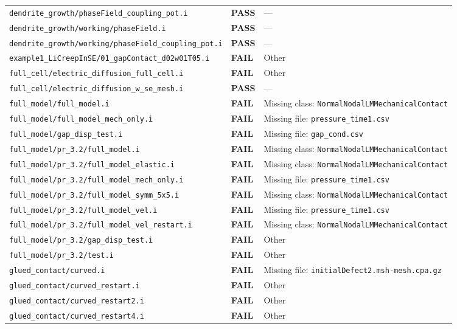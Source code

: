 \documentclass[10pt,letterpaper]{article}
\newcommand{\PASS}{\textcolor{passgreen}{\textbf{PASS}}}
\newcommand{\FAIL}{\textcolor{failred}{\textbf{FAIL}}}
\newcommand{\code}[1]{\texttt{\small #1}}
\begin{document}
\begin{longtable}{p{} l p{}}
\code{dendrite\_growth/phaseField\_coupling\_pot.i} & \PASS & --- \\
\code{dendrite\_growth/working/phaseField.i} & \PASS & --- \\
\code{dendrite\_growth/working/phaseField\_coupling\_pot.i} & \PASS & --- \\
\code{example1\_LiCreepInSE/01\_gapContact\_d02w01T05.i} & \FAIL & Other \\
\code{full\_cell/electric\_diffusion\_full\_cell.i} & \FAIL & Other \\
\code{full\_cell/electric\_diffusion\_w\_se\_mesh.i} & \PASS & --- \\
\code{full\_model/full\_model.i} & \FAIL & Missing class: \code{NormalNodalLMMechanicalContact} \\
\code{full\_model/full\_model\_mech\_only.i} & \FAIL & Missing file: \code{pressure\_time1.csv} \\
\code{full\_model/gap\_disp\_test.i} & \FAIL & Missing file: \code{gap\_cond.csv} \\
\code{full\_model/pr\_3.2/full\_model.i} & \FAIL & Missing class: \code{NormalNodalLMMechanicalContact} \\
\code{full\_model/pr\_3.2/full\_model\_elastic.i} & \FAIL & Missing class: \code{NormalNodalLMMechanicalContact} \\
\code{full\_model/pr\_3.2/full\_model\_mech\_only.i} & \FAIL & Missing file: \code{pressure\_time1.csv} \\
\code{full\_model/pr\_3.2/full\_model\_symm\_5x5.i} & \FAIL & Missing class: \code{NormalNodalLMMechanicalContact} \\
\code{full\_model/pr\_3.2/full\_model\_vel.i} & \FAIL & Missing file: \code{pressure\_time1.csv} \\
\code{full\_model/pr\_3.2/full\_model\_vel\_restart.i} & \FAIL & Missing class: \code{NormalNodalLMMechanicalContact} \\
\code{full\_model/pr\_3.2/gap\_disp\_test.i} & \FAIL & Other \\
\code{full\_model/pr\_3.2/test.i} & \FAIL & Other \\
\code{glued\_contact/curved.i} & \FAIL & Missing file: \code{initialDefect2.msh-mesh.cpa.gz} \\
\code{glued\_contact/curved\_restart.i} & \FAIL & Other \\
\code{glued\_contact/curved\_restart2.i} & \FAIL & Other \\
\code{glued\_contact/curved\_restart4.i} & \FAIL & Other \\

\end{longtable}
\end{document}
